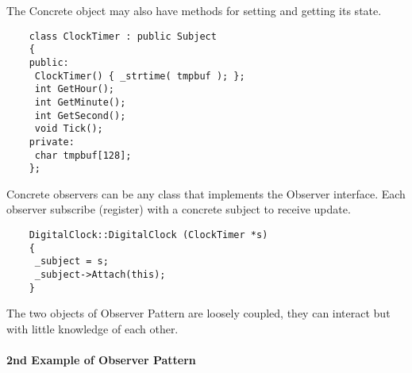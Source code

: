 \documentclass{book}
\begin{document}
    The Concrete object may also have methods for setting and getting its state.
\begin{verbatim}
    class ClockTimer : public Subject 
    { 
    public: 
     ClockTimer() { _strtime( tmpbuf ); }; 
     int GetHour(); 
     int GetMinute();
     int GetSecond(); 
     void Tick();   
    private: 
     char tmpbuf[128]; 
    }; 
\end{verbatim}
    Concrete observers can be any class that implements the Observer interface. Each observer subscribe (register) with a concrete subject to receive update.
\begin{verbatim}
    DigitalClock::DigitalClock (ClockTimer *s) 
    { 
     _subject = s; 
     _subject->Attach(this); 
    } 
\end{verbatim}
    The two objects of Observer Pattern are loosely coupled, they can interact but with little knowledge of each other.

\paragraph{2nd Example of Observer Pattern}
\end{document}
